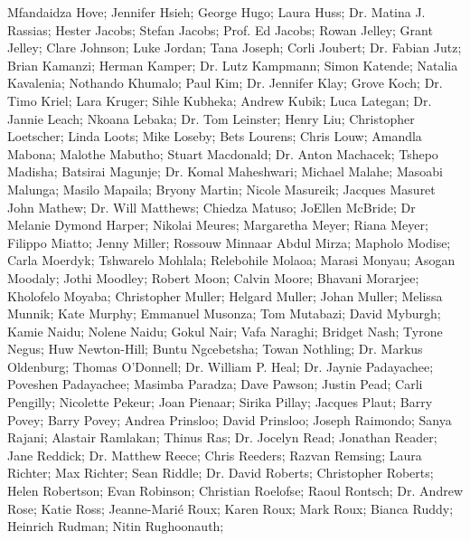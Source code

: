     Mfandaidza Hove;
    Jennifer Hsieh;
    George Hugo;
    Laura Huss;
Dr. Matina J. Rassias;
    Hester Jacobs;
    Stefan Jacobs;
Prof. Ed Jacobs;
    Rowan Jelley;
    Grant Jelley;
    Clare Johnson;
    Luke Jordan;
    Tana Joseph;
    Corli Joubert;
Dr. Fabian Jutz;
    Brian Kamanzi;
    Herman Kamper;
Dr. Lutz Kampmann;
    Simon Katende;
    Natalia Kavalenia;
    Nothando Khumalo;
    Paul Kim;
Dr. Jennifer Klay;
    Grove Koch;
Dr. Timo Kriel;
    Lara Kruger;
    Sihle Kubheka;
    Andrew Kubik;
    Luca Lategan;
Dr. Jannie Leach;
    Nkoana Lebaka;
Dr. Tom Leinster;
    Henry Liu;
    Christopher Loetscher;
    Linda Loots;
    Mike Loseby;
    Bets Lourens;
    Chris Louw;
    Amandla Mabona;
    Malothe Mabutho;
    Stuart Macdonald;
Dr. Anton Machacek;
    Tshepo Madisha;
    Batsirai Magunje;
Dr. Komal Maheshwari;
    Michael Malahe;
    Masoabi Malunga;
    Masilo Mapaila;
    Bryony Martin;
    Nicole Masureik;
    Jacques Masuret
    John Mathew;
Dr. Will Matthews;
    Chiedza Matuso;
    JoEllen McBride;
    Dr Melanie Dymond Harper;
    Nikolai Meures;
    Margaretha Meyer;
    Riana Meyer;
    Filippo Miatto;
    Jenny Miller;
    Rossouw Minnaar
    Abdul Mirza;
    Mapholo Modise;
    Carla Moerdyk;
    Tshwarelo Mohlala;
    Relebohile Molaoa;
    Marasi Monyau;
    Asogan Moodaly;
    Jothi Moodley;
    Robert Moon;
    Calvin Moore;
    Bhavani Morarjee;
    Kholofelo Moyaba;
    Christopher Muller;
    Helgard Muller;
    Johan Muller;
    Melissa Munnik;
    Kate Murphy;
    Emmanuel Musonza;
    Tom Mutabazi;
    David Myburgh;
    Kamie Naidu;
    Nolene Naidu;
    Gokul Nair;
    Vafa Naraghi;
    Bridget Nash;
    Tyrone Negus;
    Huw Newton-Hill;
    Buntu Ngcebetsha;
    Towan Nothling;
Dr. Markus Oldenburg;
    Thomas O’Donnell;
Dr. William P. Heal;
Dr. Jaynie Padayachee;
    Poveshen Padayachee;
    Masimba Paradza;
    Dave Pawson;
    Justin Pead;
    Carli Pengilly;
    Nicolette Pekeur;
    Joan Pienaar;
    Sirika Pillay;
    Jacques Plaut;
    Barry Povey;
    Barry Povey;
    Andrea Prinsloo;
    David Prinsloo;
    Joseph Raimondo;
    Sanya Rajani;
    Alastair Ramlakan;
    Thinus Ras;
Dr. Jocelyn Read;
    Jonathan Reader;
    Jane Reddick;
Dr. Matthew Reece;
    Chris Reeders;
    Razvan Remsing;
    Laura Richter;
    Max Richter;
    Sean Riddle;
Dr. David Roberts;
    Christopher Roberts;
    Helen Robertson;
    Evan Robinson;
    Christian Roelofse;
    Raoul Rontsch;
Dr. Andrew Rose;
    Katie Ross;
    Jeanne-Marié Roux;
    Karen Roux;
    Mark Roux;
    Bianca Ruddy;
    Heinrich Rudman;
    Nitin Rughoonauth;
